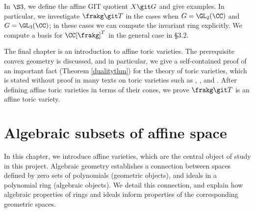 \documentclass[12pt]{amsart}
\theoremstyle{plain}
\begin{document}
In $\S 3$, we define the affine GIT quotient $X \git G$ and give examples.
In particular, we investigate $\frakg \git T$ in the cases when $G = \GL_2(\CC)$ and $G = \GL_3(\CC)$; in these cases we can compute the invariant ring explicitly.
We compute a basis for $\CC[\frakg]^T$ in the general case in \S 3.2.

The final chapter is an introduction to affine toric varieties.
The prerequisite convex geometry is discussed, and in particular, we give a self-contained proof of an important fact (Theorem \ref{dualitythm}) for the theory of toric varieties, which is stated without proof in many texts on toric varieties such as \cite{Fulton93}, \cite{CLS11}, and \cite{Oda88}.
After defining affine toric varieties in terms of their cones, we prove $\frakg \git T$ is an affine toric variety.





\newpage
\section{Algebraic subsets of affine space}
In this chapter, we introduce affine varieties, which are the central object of study in this project.
Algebraic geometry establishes a connection between spaces defined by zero sets of polynomials (geometric objects), and ideals in a polynomial ring (algebraic objects).
We detail this connection, and explain how algebraic properties of rings and ideals inform properties of the corresponding geometric spaces.
\end{document}
